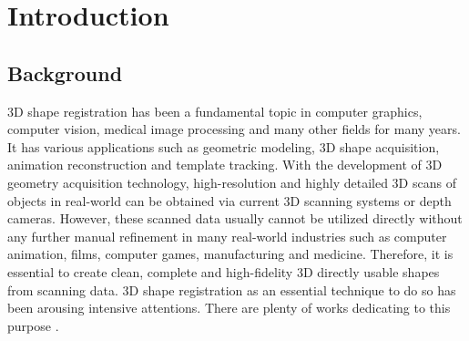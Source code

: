 
\ifx\isEmbedded\undefined


\fi
\chapter{Introduction}
\label{chap:intro}
\section{Background}
3D shape registration has been a fundamental topic in computer graphics, computer vision, medical image processing and many other fields for many years. It has various applications such as geometric modeling, 3D shape acquisition, animation reconstruction and template tracking. With the development of 3D geometry acquisition technology, high-resolution and highly detailed 3D scans of objects in real-world can be obtained via current 3D scanning systems or depth cameras. However, these scanned data usually cannot be utilized directly without any further manual refinement in many real-world industries such as computer animation, films, computer games, manufacturing and medicine. Therefore, it is essential to create clean, complete and high-fidelity 3D directly usable shapes from scanning data. 3D shape registration as an essential technique to do so has been arousing intensive attentions. There are plenty of works dedicating to this purpose \citep{amberg2007optimal,papazov2011deformable,li2008global,yang2015sparse,yamazaki2013non,li2009robust,huang2008non}.

